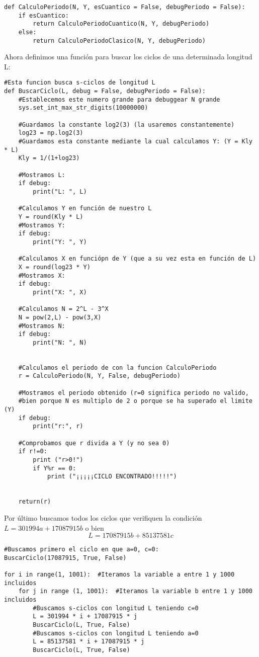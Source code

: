 \begin{verbatim}
def CalculoPeriodo(N, Y, esCuantico = False, debugPeriodo = False):
    if esCuantico:
        return CalculoPeriodoCuantico(N, Y, debugPeriodo)
    else:
        return CalculoPeriodoClasico(N, Y, debugPeriodo)
\end{verbatim}


Ahora definimos una función para buscar los ciclos de una determinada longitud L:

\begin{verbatim}
#Esta funcion busca s-ciclos de longitud L
def BuscarCiclo(L, debug = False, debugPeriodo = False):
    #Establecemos este numero grande para debuggear N grande
    sys.set_int_max_str_digits(10000000)
    
    #Guardamos la constante log2(3) (la usaremos constantemente)
    log23 = np.log2(3)
    #Guardamos esta constante mediante la cual calculamos Y: (Y = Kly * L)
    Kly = 1/(1+log23) 
    
    #Mostramos L:
    if debug:
        print("L: ", L)
        
    #Calculamos Y en función de nuestro L
    Y = round(Kly * L) 
    #Mostramos Y:
    if debug:
        print("Y: ", Y)
        
    #Calculamos X en funciópn de Y (que a su vez esta en función de L)
    X = round(log23 * Y)
    #Mostramos X:
    if debug:
        print("X: ", X)
        
    #Calculamos N = 2^L - 3^X
    N = pow(2,L) - pow(3,X)
    #Mostramos N:
    if debug:
        print("N: ", N)

    
    #Calculamos el periodo de con la funcion CalculoPeriodo
    r = CalculoPeriodo(N, Y, False, debugPeriodo) 
    
    #Mostramos el periodo obtenido (r=0 significa periodo no valido,
    #bien porque N es multiplo de 2 o porque se ha superado el limite (Y)
    if debug:
        print("r:", r)
        
    #Comprobamos que r divida a Y (y no sea 0)
    if r!=0:
        print ("r>0!")
        if Y%r == 0:
            print ("¡¡¡¡¡CICLO ENCONTRADO!!!!!")


    return(r)
\end{verbatim}


Por último buscamos todos los ciclos que verifiquen la condición $L = 301994a + 17087915b$ o bien $$L = 17087915b + 85137581c$$
\begin{verbatim}
#Buscamos primero el ciclo en que a=0, c=0:
BuscarCiclo(17087915, True, False)

for i in range(1, 1001):  #Iteramos la variable a entre 1 y 1000 incluidos
    for j in range (1, 1001):  #Iteramos la variable b entre 1 y 1000 incluidos
        #Buscamos s-ciclos con longitud L teniendo c=0
        L = 301994 * i + 17087915 * j  
        BuscarCiclo(L, True, False)
        #Buscamos s-ciclos con longitud L teniendo a=0
        L = 85137581 * i + 17087915 * j 
        BuscarCiclo(L, True, False)
\end{verbatim}



